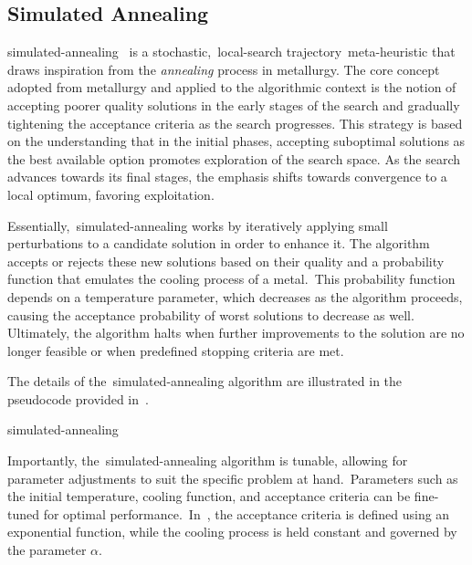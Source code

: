 \subsection{Simulated Annealing}
\label{subsec:simulated-annealing}

\acrfull{simulated-annealing}~\cite{kirkpatrick1983optimization,nikolaev2010simulateda,eglese1990simulated}
is a stochastic,~\acrshort{local-search} trajectory~\acrshort{meta-heuristic}
that draws inspiration from the \emph{annealing} process in metallurgy. The core
concept adopted from metallurgy and applied to the algorithmic context is the
notion of accepting poorer quality solutions in the early stages of the search
and gradually tightening the acceptance criteria as the search progresses. This
strategy is based on the understanding that in the initial phases, accepting
suboptimal solutions as the best available option promotes exploration of the
search space. As the search advances towards its final stages, the emphasis
shifts towards convergence to a local optimum, favoring exploitation.

Essentially,~\acrshort{simulated-annealing} works by iteratively applying small
perturbations to a candidate solution in order to enhance it. The algorithm
accepts or rejects these new solutions based on their quality and a probability
function that emulates the cooling process of a metal.~This probability function
depends on a temperature parameter, which decreases as the algorithm proceeds,
causing the acceptance probability of worst solutions to decrease as well.
Ultimately, the algorithm halts when further improvements to the solution are no
longer feasible or when predefined stopping criteria are met.

The details of the~\acrshort{simulated-annealing} algorithm are illustrated in the
pseudocode provided in~.

\begin{algorithm}
  
  \caption{\acrlong{simulated-annealing}}
  \label{algorithm:simulated-annealing}
\end{algorithm}

Importantly, the~\acrshort{simulated-annealing} algorithm is tunable, allowing
for parameter adjustments to suit the specific problem at hand.~Parameters such
as the initial temperature, cooling function, and acceptance criteria can be
fine-tuned for optimal performance.~In~, the
acceptance criteria is defined using an exponential function, while the cooling
process is held constant and governed by the parameter $\alpha$.

